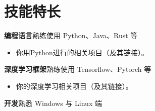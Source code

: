 \documentclass[11pt]{ctexart}
\newcommand{\primarycolor}{\color{CUGblue}}
\newlength{\iconwidth}
\begin{document}


    
    \begin{minipage}[t]{\textwidth}
        \section[技能特长]{\makebox[\iconwidth][c]{\primarycolor{\faLaptopCode}}\quad 技能特长}
        {\large \textbf{编程语言}}\quad 熟练使用 Python、Java、Rust 等
		\begin{itemize}
			\item 你用Python进行的相关项目（及其链接）。
		\end{itemize}
		\vspace{0.5em}
        {\large \textbf{深度学习框架}}\quad 熟练使用 Tensorflow、Pytorch 等
		\begin{itemize}
			\item 你的深度学习相关项目（及其链接）。
		\end{itemize}
		\vspace{0.5em}
        {\large \textbf{开发}}\quad 熟悉 Windows 与 Linux 端
		\vspace{0.5em}

	\vspace{1.2em}
    \end{minipage}
    
\end{document}
